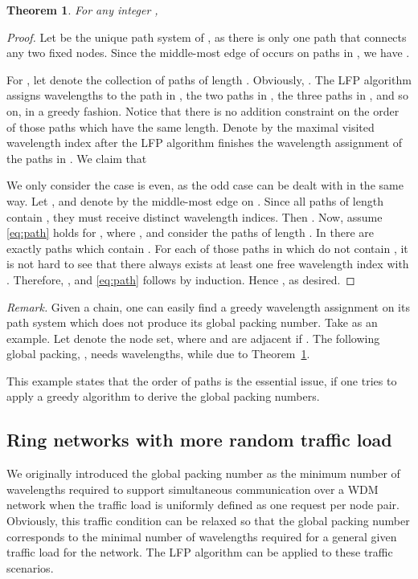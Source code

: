\documentclass[journal,draftcls,onecolumn,12pt,twoside]{IEEEtran}
\newtheorem{theorem}{\bf Theorem}
\begin{document}
\begin{theorem}\label{thm:path}
For any integer ,

\end{theorem}
\begin{proof}
Let  be the unique path system of , as there is only one path that connects any two fixed nodes.
Since the middle-most edge of  occurs on  paths in , we have .

For , let  denote the collection of paths of length .
Obviously, .
The LFP algorithm assigns wavelengths to the path in , the two paths in , the three paths in , and so on, in a greedy fashion.
Notice that there is no addition constraint on the order of those paths which have the same length.
Denote by  the maximal visited wavelength index after the LFP algorithm finishes the wavelength assignment of the paths in .
We claim that 


We only consider the case  is even, as the odd case can be dealt with in the same way.
Let , and denote by  the middle-most edge on .
Since all paths of length  contain , they must receive distinct wavelength indices.
Then .
Now, assume \eqref{eq:path} holds for , where , and consider the paths of length .
In  there are exactly  paths which contain .
For each of those paths in  which do not contain , it is not hard to see that there always exists at least one free wavelength index  with .
Therefore, , and \eqref{eq:path} follows by induction.
Hence , as desired.
\end{proof}

\noindent \emph{Remark.} 
Given a chain, one can easily find a greedy wavelength assignment on its path system which does not produce its global packing number.
Take  as an example.
Let  denote the node set, where  and  are adjacent if .
The following global packing, , needs  wavelengths, while  due to Theorem~\ref{thm:path}.

This example states that the order of paths is the essential issue, if one tries to apply a greedy algorithm to derive the global packing numbers.


\subsection{Ring networks with more random traffic load}
We originally introduced the global packing number as the minimum number of wavelengths
required to support simultaneous communication over a WDM network when the traffic
load is uniformly defined as one request per node pair.  Obviously, this traffic condition can be relaxed so that the global packing number corresponds to the minimal
number of wavelengths required for a general given traffic load for the network.
The LFP algorithm can be applied to these traffic scenarios.
\end{document}
